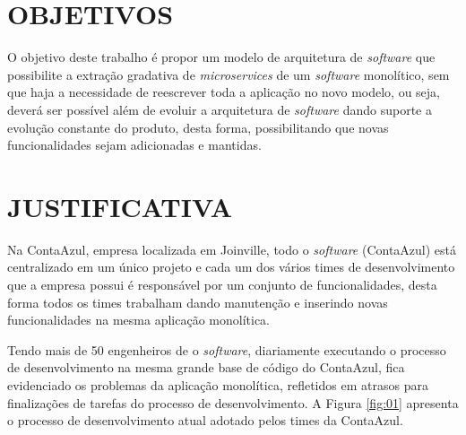 \section{OBJETIVOS}

O objetivo deste trabalho é propor um modelo de arquitetura de \textit{software} que possibilite a extração gradativa de \textit{microservices} de um \textit{software} monolítico, sem que haja a necessidade de reescrever toda a aplicação no novo modelo, ou seja, deverá ser possível além de evoluir a arquitetura de \textit{software} dando suporte a evolução constante do produto, desta forma, possibilitando que novas funcionalidades sejam adicionadas e mantidas.

\section{JUSTIFICATIVA}

Na ContaAzul, empresa localizada em Joinville, todo o \textit{software} (ContaAzul) está centralizado em um único projeto e cada um dos vários times de desenvolvimento que a empresa possui é responsável por um conjunto de funcionalidades, desta forma todos os times trabalham dando manutenção e inserindo novas funcionalidades na mesma aplicação monolítica.

Tendo mais de 50 engenheiros de  o \textit{software}, diariamente executando o processo de desenvolvimento na mesma grande base de código do ContaAzul, fica evidenciado os problemas da aplicação monolítica, refletidos em atrasos para finalizações de tarefas do processo de desenvolvimento. A Figura \ref{fig:01} apresenta o processo de desenvolvimento atual adotado pelos times da ContaAzul.

